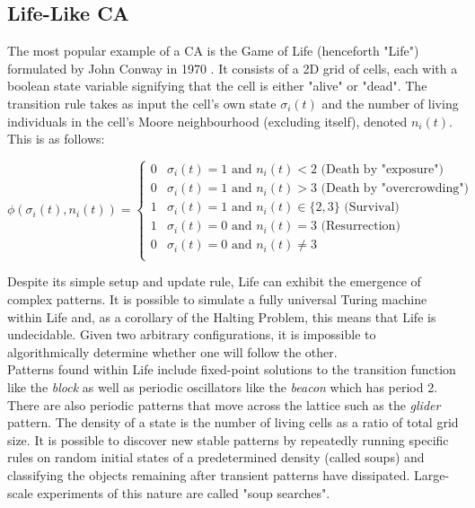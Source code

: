 \subsection{Life-Like CA} \label{sub:life}
The most popular example of a CA is the Game of Life (henceforth "Life") formulated by John Conway in 1970 \cite{gardner1970fantastic}. It consists of a 2D grid of cells, each with a boolean state variable signifying that the cell is either "alive" or "dead". The transition rule takes as input the cell's own state $\sigma_i(t)$ and the number of living individuals in the cell's Moore neighbourhood (excluding itself), denoted $n_i(t)$. This is as follows:

\begin{equation}
  \phi(\sigma_i(t), n_i(t)) = 
\begin{cases}
  0 & \sigma_i(t) = 1 \text{ and } n_i(t) < 2 \text{  (Death by "exposure")}\\
  0 & \sigma_i(t) = 1 \text{ and } n_i(t) > 3 \text{  (Death by "overcrowding")}\\
  1 & \sigma_i(t) = 1 \text{ and } n_i(t) \in \{2,3\} \text{  (Survival)}\\
  1 & \sigma_i(t) = 0 \text{ and } n_i(t) = 3 \text{  (Resurrection)}\\
  0 & \sigma_i(t) = 0 \text{ and } n_i(t) \neq 3 \\
\end{cases}
\end{equation}

Despite its simple setup and update rule, Life can exhibit the emergence of complex patterns. It is possible to simulate a fully universal Turing machine within Life\cite{rendell} and, as a corollary of the Halting Problem, this means that Life is undecidable. Given two arbitrary configurations, it is impossible to algorithmically determine whether one will follow the other.\\

Patterns found within Life include fixed-point solutions to the transition function like the \textit{block} as well as periodic oscillators like the \textit{beacon} which has period 2. There are also periodic patterns that move across the lattice such as the \textit{glider} pattern. The density of a state is the number of living cells as a ratio of total grid size. It is possible to discover new stable patterns by repeatedly running specific rules on random initial states of a predetermined density (called soups) and classifying the objects remaining after transient patterns have dissipated. Large-scale experiments of this nature are called "soup searches"\cite{flammenkamp}.\\

